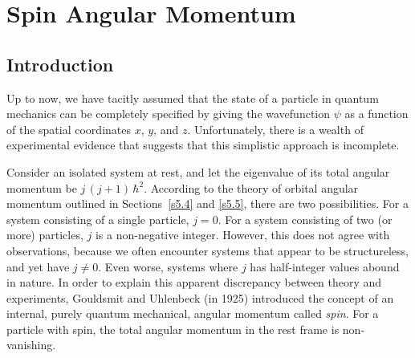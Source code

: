 \chapter{Spin Angular Momentum}\label{s5}

\section{Introduction}
Up to now, we have tacitly assumed that the state of a particle in quantum
mechanics can be completely specified by giving the wavefunction $\psi$ 
as a function of the spatial coordinates $x$, $y$, and $z$. Unfortunately,
there is a wealth of experimental evidence that suggests that this simplistic
approach is incomplete. 

Consider an isolated system at rest, and let the eigenvalue of its total
angular momentum be $j\,(j+1)\,\hbar^2$. According to the theory of orbital
angular momentum outlined in Sections~\ref{s5.4} and \ref{s5.5}, there are two possibilities.
For a system consisting of a single particle, $j=0$. For a system consisting
of two (or more) particles, $j$ is a non-negative integer. 
However, this does not
agree with observations, because we often encounter systems that appear to
be structureless, and yet have $j\neq 0$. Even worse, systems where $j$
has half-integer values abound in nature. 
In order to  explain this apparent discrepancy
between theory and experiments, Gouldsmit and Uhlenbeck (in 1925)
introduced the concept of an internal, purely quantum mechanical, angular momentum
called {\em spin}. For a particle with spin, the total angular momentum in the
rest frame is non-vanishing. 


